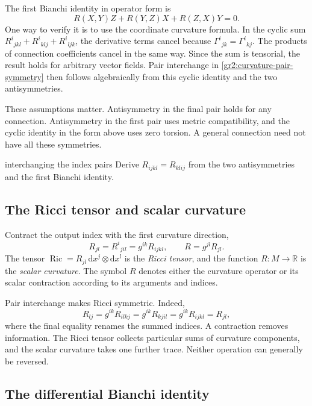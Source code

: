 \documentclass[11pt,a4paper]{article}
\numberwithin{equation}{section}
\newcommand{\R}{\mathbb R}
\newcommand{\dd}{\mathrm d}
\begin{document}
The first Bianchi identity in operator form is
\begin{equation}
 R(X,Y)Z+R(Y,Z)X+R(Z,X)Y=0.
 \label{gr2:algebraic-bianchi-operator}
\end{equation}
One way to verify it is to use the coordinate curvature formula.
In the cyclic sum
\(R^i{}_{jkl}+R^i{}_{klj}+R^i{}_{ljk}\), the derivative terms cancel
because \(\Gamma^i{}_{jk}=\Gamma^i{}_{kj}\). The products of connection
coefficients cancel in the same way. Since the sum is tensorial, the
result holds for arbitrary vector fields. Pair interchange in
\eqref{gr2:curvature-pair-symmetry} then follows algebraically from
this cyclic identity and the two antisymmetries.

These assumptions matter. Antisymmetry in the final pair holds for
any connection. Antisymmetry in the first pair uses metric
compatibility, and the cyclic identity in the form above uses zero
torsion. A general connection need not have all these symmetries.

\begin{studentwork}[3cm]{interchanging the index pairs}
Derive \(R_{ijkl}=R_{klij}\) from the two antisymmetries and the first
Bianchi identity.
\end{studentwork}

\subsection{The Ricci tensor and scalar curvature}

Contract the output index with the first curvature direction,
\begin{equation}
 R_{jl}=R^i{}_{jil}=g^{ik}R_{ijkl},
 \qquad R=g^{jl}R_{jl}.
 \label{gr2:ricci-contractions}
\end{equation}
The tensor \(\operatorname{Ric}=R_{jl}\,\dd x^j\otimes\dd x^l\)
is the \emph{Ricci tensor}, and the function \(R:M\to\R\) is the
\emph{scalar curvature}. The symbol \(R\) denotes either the
curvature operator or its scalar contraction according to its
arguments and indices.

Pair interchange makes Ricci symmetric. Indeed,
\[
 R_{lj}=g^{ik}R_{ilkj}
       =g^{ik}R_{kjil}
       =g^{ik}R_{ijkl}=R_{jl},
\]
where the final equality renames the summed indices. A contraction
removes information. The Ricci tensor collects particular sums of
curvature components, and the scalar curvature takes one further
trace. Neither operation can generally be reversed.

\subsection{The differential Bianchi identity}
\end{document}
